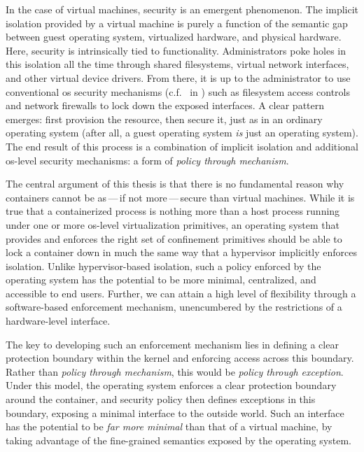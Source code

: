 
In the case of virtual machines, security is an emergent phenomenon. The implicit
isolation provided by a virtual machine is purely a function of the semantic gap between
guest operating system, virtualized hardware, and physical hardware. Here, security is
intrinsically tied to functionality. Administrators poke holes in this isolation all the
time through shared filesystems, virtual network interfaces, and other virtual device
drivers. From there, it is up to the administrator to use conventional \gls{os} security
mechanisms (c.f.\  in
) such as filesystem access controls and network firewalls to lock down
the exposed interfaces.  A clear pattern emerges: first provision the resource, then secure
it, just as in an ordinary operating system (after all, a guest operating system
\textit{is} just an operating system). The end result of this process is a combination of
implicit isolation and additional \gls{os}-level security mechanisms: a form of
\textit{policy through mechanism}.

The central argument of this thesis is that there is no fundamental reason why containers
cannot be as\,---\,if not more\,---\,secure than virtual machines.  While it is true that
a containerized process is nothing more than a host process running under one or more
\gls{os}-level virtualization primitives, an operating system that provides and enforces
the right set of confinement primitives should be able to lock a container down in much
the same way that a hypervisor implicitly enforces isolation.  Unlike hypervisor-based
isolation, such a policy enforced by the operating system has the potential to be more
minimal, centralized, and accessible to end users. Further, we can attain a high level of
flexibility through a software-based enforcement mechanism, unencumbered by the
restrictions of a hardware-level interface.

The key to developing such an enforcement mechanism lies in defining a clear protection
boundary within the kernel and enforcing access across this boundary. Rather than
\textit{policy through mechanism}, this would be \textit{policy through exception}. Under
this model, the operating system enforces a clear protection boundary around the
container, and security policy then defines exceptions in this boundary, exposing
a minimal interface to the outside world.  Such an interface has the potential to be
\textit{far more minimal}  than that of a virtual machine, by taking advantage of the
fine-grained semantics exposed by the operating system.

